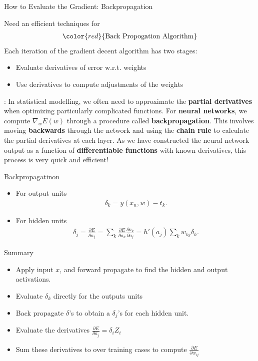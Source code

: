 \documentclass[10pt, hyperref={colorlinks = true,linkcolor = blue}]{beamer}
\begin{document}
{{{\begin{frame}{How to Evaluate the Gradient: Backpropagation}

Need an efficient techniques for {\color{violet}{evaluating the gradient $\nabla_w E$}}
\begin{align*}
{\color{red}{\text{Back Propogation Algorithm}}}
\end{align*}
Each iteration of the gradient decent algorithm has two stages:
\begin{itemize}
\item Evaluate derivatives of error w.r.t. weights
\item Use derivatives to compute adjustments of the weights 
\end{itemize}
\vspace{3mm}
{\color{violet}{Note}}:
In statistical modelling, we often need to approximate the \textbf{partial derivatives} when optimizing particularly complicated functions. For \textbf{neural networks}, we compute \( \nabla_w E(w) \) through a procedure called \textbf{backpropagation}. This involves moving \textbf{backwards} through the network and using the \textbf{chain rule} to calculate the partial derivatives at each layer. As we have constructed the neural network output as a function of \textbf{differentiable functions} with known derivatives, this process is very quick and efficient!


\end{frame}

\begin{frame}{Backpropagatinon}

\begin{itemize}
\item For output units
\begin{align*}
\delta_k = y(x_n, w) - t_k.
\end{align*}
\item For hidden units 
\begin{align*}
\delta_j = \frac{\partial E}{\partial a_j} = \sum_{k}  \frac{\partial E}{\partial a_k} \frac{\partial a_k}{\partial a_j} = h'\left(a_j\right) \sum_{k} w_{kj} \delta_k.
\end{align*}
\end{itemize}
Summary
\begin{itemize}
\item Apply input $x$, and forward propagate to find the hidden and output activations. 
\item Evaluate $\delta_k$ directly for the outputs units
\item Back propagate $\delta$'s to obtain a $\delta_j$'s for each hidden unit.
\item Evaluate the derivatives  $\frac{\partial E}{\partial a_j} = \delta_i Z_i$
\item  Sum these derivatives to over training cases to compute $\frac{\partial E}{\partial w_{ij}} $  
\end{itemize}
\end{frame}
}

}}
\end{document}
